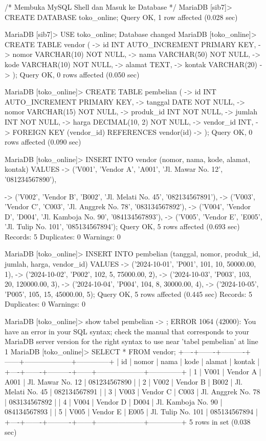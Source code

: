 /* Membuka MySQL Shell dan Masuk ke Database */
MariaDB [sib7]> CREATE DATABASE toko_online;
Query OK, 1 row affected (0.028 sec)

MariaDB [sib7]> USE toko_online;
Database changed
MariaDB [toko_online]> CREATE TABLE vendor (
    ->     id INT AUTO_INCREMENT PRIMARY KEY,
    ->     nomor VARCHAR(10) NOT NULL,
    ->     nama VARCHAR(50) NOT NULL,
    ->     kode VARCHAR(10) NOT NULL,
    ->     alamat TEXT,
    ->     kontak VARCHAR(20)
    -> );
Query OK, 0 rows affected (0.050 sec)

MariaDB [toko_online]> CREATE TABLE pembelian (
    ->     id INT AUTO_INCREMENT PRIMARY KEY,
    ->     tanggal DATE NOT NULL,
    ->     nomor VARCHAR(15) NOT NULL,
    ->     produk_id INT NOT NULL,
    ->     jumlah INT NOT NULL,
    ->     harga DECIMAL(10, 2) NOT NULL,
    ->     vendor_id INT,
    ->     FOREIGN KEY (vendor_id) REFERENCES vendor(id)
    -> );
Query OK, 0 rows affected (0.090 sec)

MariaDB [toko_online]> INSERT INTO vendor (nomor, nama, kode, alamat, kontak) VALUES
    -> ('V001', 'Vendor A', 'A001', 'Jl. Mawar No. 12', '081234567890'),

    -> ('V002', 'Vendor B', 'B002', 'Jl. Melati No. 45', '082134567891'),
    -> ('V003', 'Vendor C', 'C003', 'Jl. Anggrek No. 78', '083134567892'),
    -> ('V004', 'Vendor D', 'D004', 'Jl. Kamboja No. 90', '084134567893'),
    -> ('V005', 'Vendor E', 'E005', 'Jl. Tulip No. 101', '085134567894');
Query OK, 5 rows affected (0.693 sec)
Records: 5  Duplicates: 0  Warnings: 0

MariaDB [toko_online]> INSERT INTO pembelian (tanggal, nomor, produk_id, jumlah, harga, vendor_id) VALUES
    -> ('2024-10-01', 'P001', 101, 10, 50000.00, 1),
    -> ('2024-10-02', 'P002', 102, 5, 75000.00, 2),
    -> ('2024-10-03', 'P003', 103, 20, 120000.00, 3),
    -> ('2024-10-04', 'P004', 104, 8, 30000.00, 4),
    -> ('2024-10-05', 'P005', 105, 15, 45000.00, 5);
Query OK, 5 rows affected (0.445 sec)
Records: 5  Duplicates: 0  Warnings: 0

MariaDB [toko_online]> show tabel pembelian
    -> ;
ERROR 1064 (42000): You have an error in your SQL syntax; check the manual that corresponds to your MariaDB server version for the right syntax to use near 'tabel pembelian' at line 1
MariaDB [toko_online]> SELECT * FROM vendor;
+----+-------+----------+------+--------------------+--------------+
| id | nomor | nama     | kode | alamat             | kontak       |
+----+-------+----------+------+--------------------+--------------+
|  1 | V001  | Vendor A | A001 | Jl. Mawar No. 12   | 081234567890 |
|  2 | V002  | Vendor B | B002 | Jl. Melati No. 45  | 082134567891 |
|  3 | V003  | Vendor C | C003 | Jl. Anggrek No. 78 | 083134567892 |
|  4 | V004  | Vendor D | D004 | Jl. Kamboja No. 90 | 084134567893 |
|  5 | V005  | Vendor E | E005 | Jl. Tulip No. 101  | 085134567894 |
+----+-------+----------+------+--------------------+--------------+
5 rows in set (0.038 sec)

